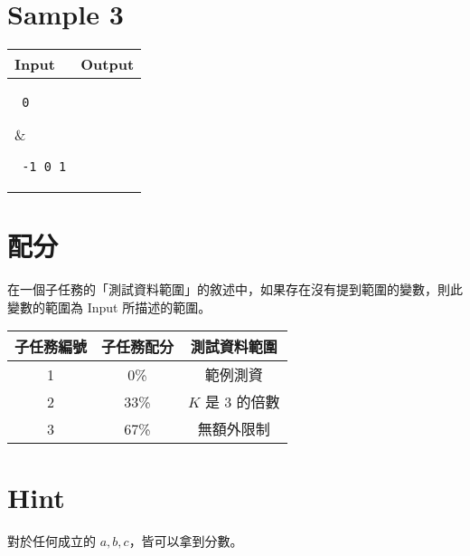 \documentclass[11pt,a4paper]{article}
\begin{document}
\section*{Sample 3}
\begin{longtable}[!h]{|p{}|p{}|}
\hline
\textbf {Input}	& \textbf {Output} \\
\hline
\parbox[t]{0.5\textwidth} %
{ \tt
0 \\
} &
\parbox[t]{0.5\textwidth}
{ \tt
-1 0 1 \\
} \\
\hline
\end{longtable}

\section*{配分}

在一個子任務的「測試資料範圍」的敘述中，如果存在沒有提到範圍的變數，則此變數的範圍為 Input 所描述的範圍。

\begin{center}
 \begin{tabular}{||c c c||} 
 \hline
 子任務編號 & 子任務配分 & 測試資料範圍 \\  
 \hline\hline
 1 & 0\% & 範例測資 \\ 
 \hline
 2 & 33\% & $K$ 是 $3$ 的倍數 \\
 \hline
 3 & 67\% & 無額外限制 \\
 \hline
\end{tabular}
\end{center}

\section*{Hint}
對於任何成立的 $a, b, c$，皆可以拿到分數。
\end{document}
